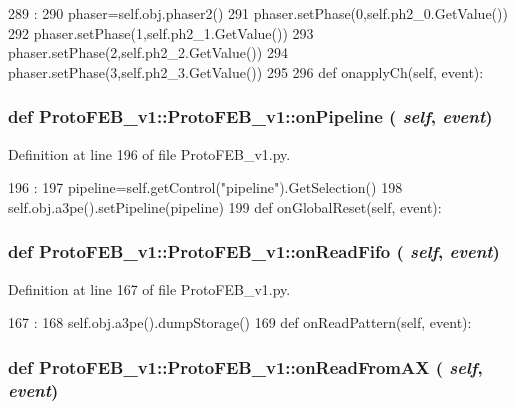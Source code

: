 \begin{DoxyCode}
289                               :
290         phaser=self.obj.phaser2()
291         phaser.setPhase(0,self.ph2_0.GetValue())
292         phaser.setPhase(1,self.ph2_1.GetValue())
293         phaser.setPhase(2,self.ph2_2.GetValue())
294         phaser.setPhase(3,self.ph2_3.GetValue())
295 
296 
    def onapplyCh(self, event):
\end{DoxyCode}
\hypertarget{classProtoFEB__v1_1_1ProtoFEB__v1_a6d345e643ca8673d761aea4830cc40c5}{
\subsubsection[{onPipeline}]{\setlength{\rightskip}{0pt plus 5cm}def ProtoFEB\_\-v1::ProtoFEB\_\-v1::onPipeline ( {\em self}, \/   {\em event})}}
\label{classProtoFEB__v1_1_1ProtoFEB__v1_a6d345e643ca8673d761aea4830cc40c5}


Definition at line 196 of file ProtoFEB\_\-v1.py.


\begin{DoxyCode}
196                                :
197         pipeline=self.getControl("pipeline").GetSelection()
198         self.obj.a3pe().setPipeline(pipeline)
199 
    def onGlobalReset(self, event):
\end{DoxyCode}
\hypertarget{classProtoFEB__v1_1_1ProtoFEB__v1_a87e1d49a8627f6092b24ee89615c66d3}{
\subsubsection[{onReadFifo}]{\setlength{\rightskip}{0pt plus 5cm}def ProtoFEB\_\-v1::ProtoFEB\_\-v1::onReadFifo ( {\em self}, \/   {\em event})}}
\label{classProtoFEB__v1_1_1ProtoFEB__v1_a87e1d49a8627f6092b24ee89615c66d3}


Definition at line 167 of file ProtoFEB\_\-v1.py.


\begin{DoxyCode}
167                                :
168         self.obj.a3pe().dumpStorage()
169 
    def onReadPattern(self, event):
\end{DoxyCode}
\hypertarget{classProtoFEB__v1_1_1ProtoFEB__v1_a3245fdcfbb7727e9da4aeb481355b8c0}{
\subsubsection[{onReadFromAX}]{\setlength{\rightskip}{0pt plus 5cm}def ProtoFEB\_\-v1::ProtoFEB\_\-v1::onReadFromAX ( {\em self}, \/   {\em event})}}
\label{classProtoFEB__v1_1_1ProtoFEB__v1_a3245fdcfbb7727e9da4aeb481355b8c0}



